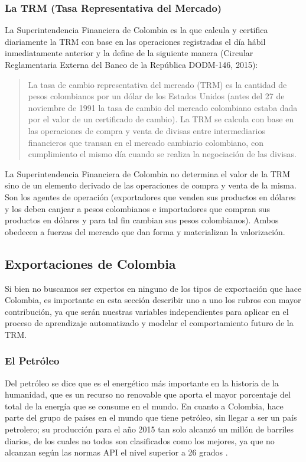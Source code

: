 \subsubsection{La TRM (Tasa Representativa del Mercado)}
La Superintendencia Financiera de Colombia es la que calcula y certifica diariamente la TRM con base en las operaciones registradas el día hábil inmediatamente  anterior  y  la  define  de  la  siguiente  manera  (Circular  Reglamentaria Externa del Banco de la República DODM-146, 2015):

	\begin{quote}La  tasa  de  cambio  representativa  del  mercado  (TRM)  es  la  cantidad de pesos colombianos por un dólar de los Estados Unidos (antes del 27 de noviembre de 1991 la tasa de cambio del mercado colombiano estaba dada por el valor de un certificado de cambio). La TRM se calcula con base en las operaciones de compra y venta de divisas entre intermediarios financieros que transan en el mercado cambiario colombiano, con cumplimiento el mismo día cuando se realiza la negociación de las divisas.
	\end{quote}

La Superintendencia Financiera de Colombia no determina el valor de la TRM sino de un elemento derivado de las operaciones de compra y venta de la misma. Son los agentes de operación (exportadores que venden sus productos en dólares y los deben canjear a pesos colombianos e importadores que compran sus productos en dólares y para tal fin cambian sus pesos colombianos). Ambos obedecen a fuerzas del mercado que dan forma y materializan la valorización.

\subsection{Exportaciones de Colombia}
Si bien no buscamos ser expertos en ninguno de los tipos de exportación que hace Colombia, es importante en esta sección describir uno a uno los rubros con mayor contribución, ya que serán nuestras variables independientes para aplicar en el proceso de aprendizaje automatizado y modelar el comportamiento futuro de la TRM. 

\subsubsection{El Petróleo}
Del petróleo se dice que es el energético más importante en la historia de la humanidad, que es un recurso no renovable que aporta el mayor porcentaje del total de la energía que se consume en el mundo. En cuanto a Colombia, hace parte del grupo de países en el mundo que tiene petróleo, sin llegar a ser un país petrolero; su producción para el año 2015 tan solo alcanzó un millón de barriles diarios, de los cuales no todos son clasificados como los mejores, ya que no alcanzan según las normas API el nivel superior a 26 grados \cite{cardenas}. 

